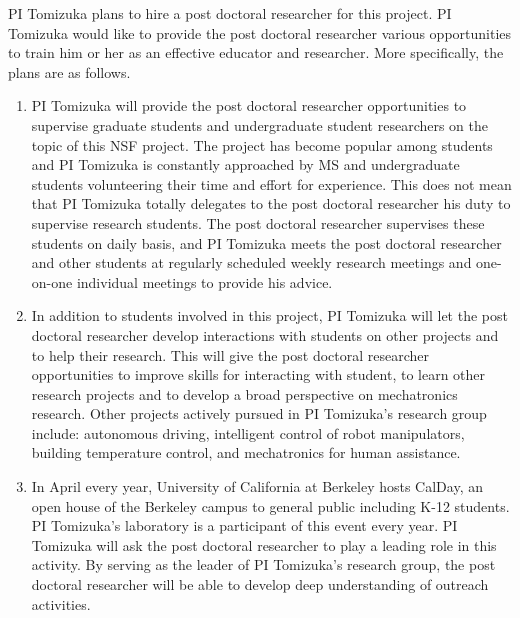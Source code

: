 PI Tomizuka plans to hire a post doctoral researcher for this project. PI Tomizuka would like to provide the post doctoral researcher various opportunities to train him or her as an effective educator and researcher. More specifically, the plans are as follows.
\begin{enumerate}
\item PI Tomizuka will provide the post doctoral researcher opportunities to supervise graduate students and undergraduate student researchers on the topic of this NSF project. The project has become popular among students and PI Tomizuka is constantly approached by MS and undergraduate students volunteering their time and effort for experience. This does not mean that PI Tomizuka totally delegates to the post doctoral researcher his duty to supervise research students. The post doctoral researcher supervises these students on daily basis, and PI Tomizuka meets the post doctoral researcher and other students at regularly scheduled weekly research meetings and one-on-one individual meetings to provide his advice. 
\item In addition to students involved in this project, PI Tomizuka will let the post doctoral researcher develop interactions with students on other projects and to help their research. This will give the post doctoral researcher opportunities to improve skills for interacting with student, to learn other research projects and to develop a broad perspective on mechatronics research.  Other projects actively pursued in PI Tomizuka's research group include: autonomous driving, intelligent control of robot manipulators, building temperature control, and mechatronics for human assistance.
\item In April every year, University of California at Berkeley hosts CalDay, an open house of the Berkeley campus to general public including K-12 students.  PI Tomizuka's laboratory is a participant of this event every year. PI Tomizuka will ask the post doctoral researcher to play a leading role in this activity. By serving as the leader of PI Tomizuka's research group, the post doctoral researcher will be able to develop deep understanding of outreach activities.  
\end{enumerate}


